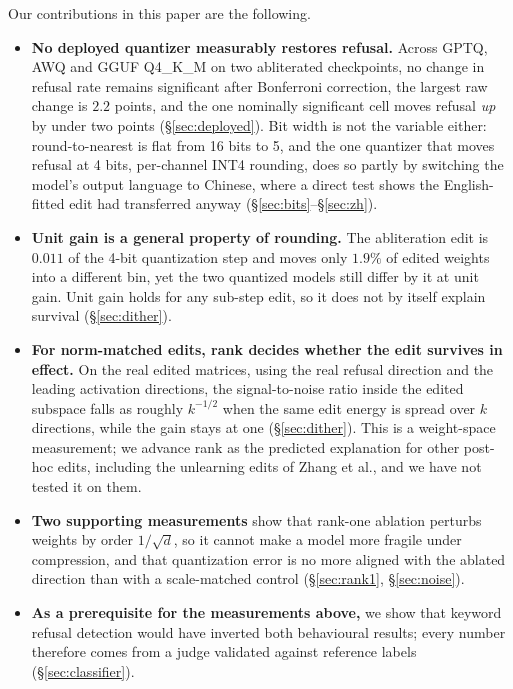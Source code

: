 \documentclass[conference,compsoc,letterpaper]{IEEEtran}
\begin{document}
Our contributions in this paper are the following.

\begin{itemize}
\item \textbf{No deployed quantizer measurably restores refusal.} Across GPTQ,
      AWQ and GGUF Q4\_K\_M on two abliterated checkpoints, no change in refusal
      rate remains significant after Bonferroni correction, the largest raw
      change is $2.2$ points, and the one nominally significant cell moves
      refusal \emph{up} by under two points (\S\ref{sec:deployed}). Bit width is
      not the variable either: round-to-nearest is flat from 16 bits to 5, and
      the one quantizer that moves refusal at 4 bits, per-channel INT4 rounding,
      does so partly by switching the model's output language to Chinese, where
      a direct test shows the English-fitted edit had transferred anyway
      (\S\ref{sec:bits}--\S\ref{sec:zh}).
\item \textbf{Unit gain is a general property of rounding.} The
      abliteration edit is $0.011$ of the 4-bit quantization step and moves
      only $1.9\%$ of edited weights into a different bin, yet the two
      quantized models still differ by it at unit gain. Unit gain holds for any
      sub-step edit, so it does not by itself explain survival
      (\S\ref{sec:dither}).
\item \textbf{For norm-matched edits, rank decides whether the edit survives in
      effect.} On the real edited matrices, using the real refusal direction and
      the leading activation directions, the signal-to-noise ratio inside the
      edited subspace falls as roughly $k^{-1/2}$ when the same edit energy is
      spread over $k$ directions, while the gain stays at one
      (\S\ref{sec:dither}). This is a weight-space measurement; we advance rank
      as the predicted explanation for other post-hoc edits, including the
      unlearning edits of Zhang et al., and we have not tested it on them.
\item \textbf{Two supporting measurements} show that rank-one ablation perturbs
      weights by order $1/\sqrt{d}$, so it cannot make a model more
      fragile under compression, and that quantization error is no more aligned
      with the ablated direction than with a scale-matched control
      (\S\ref{sec:rank1}, \S\ref{sec:noise}).
\item \textbf{As a prerequisite for the measurements above,} we show that keyword
      refusal detection would have inverted both behavioural results; every number
      therefore comes from a judge validated against reference labels (\S\ref{sec:classifier}).
\end{itemize}
\end{document}
